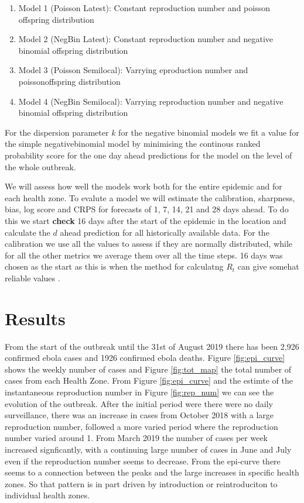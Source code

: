 \documentclass[12pt]{article}
\begin{document}
\begin{enumerate}
\item{Model 1 (Poisson Latest): Constant reproduction number and poisson offspring distribution}
\item{Model 2 (NegBin Latest): Constant reproduction number and negative binomial offspring distribution}
\item{Model 3 (Poisson Semilocal): Varrying eproduction number and poissonoffspring distribution}
\item{Model 4 (NegBin Semilocal): Varrying reproduction number and negative binomial offspring distribution}
\end{enumerate}

For the dispersion parameter $k$ for the negative binomial models we fit a value for the simple negativebinomial model by minimising the continous ranked probability score for the one day ahead predictions for the model on the level of the whole outbreak. 

We will assess how well the models work both for the entire epidemic and for each health zone. To evalute a model we will estimate the calibration, sharpness, bias, log score and CRPS for forecasts of 1, 7, 14, 21 and 28 days ahead. To do this we start { \bf check } 16 days after the start of the epidemic in the location and calculate the $d$ ahead prediction for all historically available data. For the calibration we use all the values to assess if they are normally distributed, while for all the other metrics we average them over all the time steps. 16 days was chosen as the start as this is when the method for calculatng $R_t$ can give somehat reliable values \cite{coriNewFrameworkSoftware2013}. 



\section{Results}
From the start of the outbreak until the 31st of August 2019 there has been 2,926 confirmed ebola cases and 1926 confirmed ebola deaths. Figure \ref{fig:epi_curve} shows the weekly number of cases and Figure \ref{fig:tot_map} the total number of cases from each Health Zone. From Figure \ref{fig:epi_curve} and the estimte of the instantaneous reproduction number in Figure \ref{fig:rep_num} we can see the evolution of the outbreak. After the initial period were there were no daily surveillance, there was an increase in cases from October 2018 with a large reproduction number, followed a more varied period where the reproduction number varied around 1. From March 2019 the number of cases per week increased signficantly, with a continuing large number of cases in June and July even if the reproduction number seems to decrease. From the epi-curve there seems to a connection between the peaks and the large increases in specific health zones. So that pattern is in part driven by introduction or reintroduciton to individual health zones. 
\end{document}
